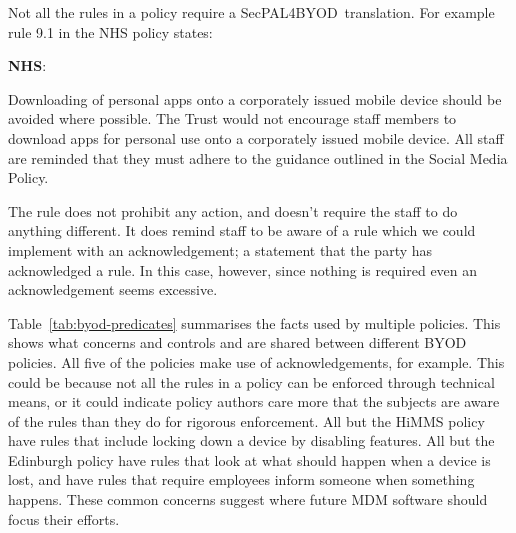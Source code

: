 \documentclass{llncs}
\newcommand{\AppPAL}[0]{SecPAL4BYOD}
\newenvironment{policyrule}[1]{%
  \begin{mdframed}\footnotesize
      \noindent\textbf{\sffamily #1}:~\itshape%
}{%
  \end{mdframed}
}
\begin{document}
Not all the rules in a policy require a \AppPAL~translation.
For example rule 9.1 in the NHS policy states:
\begin{policyrule}{NHS}
  Downloading of personal apps onto a corporately issued mobile device should be avoided where possible.
  The Trust would not encourage staff members to download apps for personal use onto a corporately issued mobile device.
  All staff are reminded that they must adhere to the guidance outlined in the Social Media Policy.
\end{policyrule}
The rule does not prohibit any action, and doesn't require the staff to do anything different.
It does remind staff to be aware of a rule which we could implement with an acknowledgement; a statement that the party has acknowledged a rule.
In this case, however, since nothing is required even an acknowledgement seems excessive.

Table~\ref{tab:byod-predicates} summarises the facts used by multiple policies.
This shows what concerns and controls and are shared between different BYOD policies.
All five of the policies make use of acknowledgements, for example.
This could be because not all the rules in a policy can be enforced through technical means, 
  or it could indicate policy authors care more that the subjects are aware of the rules than they do for rigorous enforcement.
All but the HiMMS policy have rules that include locking down a device by disabling features.
All but the Edinburgh policy have rules that look at what should happen when a device is lost,
  and have rules that require employees inform someone when something happens.
These common concerns suggest where future \ac{MDM} software should focus their efforts.
\end{document}
